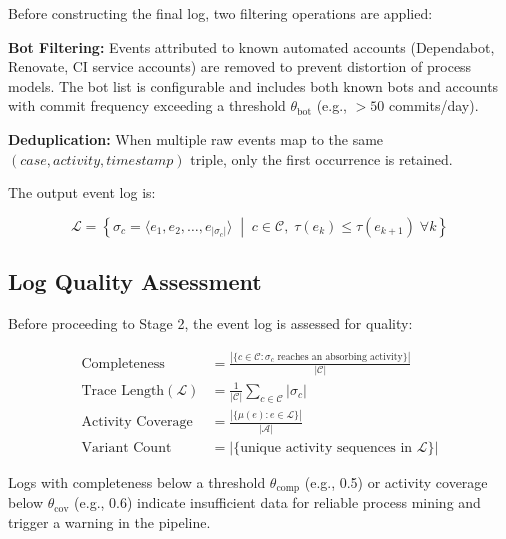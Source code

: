 Before constructing the final log, two filtering operations are applied:

\textbf{Bot Filtering:} Events attributed to known automated accounts 
(Dependabot, Renovate, CI service accounts) are removed to prevent 
distortion of process models. The bot list is configurable and includes 
both known bots and accounts with commit frequency exceeding a threshold 
$\theta_{\text{bot}}$ (e.g., $> 50$ commits/day).

\textbf{Deduplication:} When multiple raw events map to the same 
$(case, activity, timestamp)$ triple, only the first occurrence is 
retained.

The output event log is:

\begin{equation}
\label{eq:final-log}
\mathcal{L} = \left\{ \sigma_c = \langle e_1, e_2, \ldots, e_{|\sigma_c|} \rangle 
    \;\middle|\; c \in \mathcal{C}, \; 
    \tau(e_k) \leq \tau(e_{k+1}) \; \forall k \right\}
\end{equation}

\subsection{Log Quality Assessment}
\label{sec:s1-quality}

Before proceeding to Stage 2, the event log is assessed for quality:

\begin{definition}
\label{def:log-quality}
\begin{align}
\text{Completeness} &= \frac{|\{c \in \mathcal{C} : \sigma_c \text{ reaches an absorbing activity}\}|}{|\mathcal{C}|} 
    \label{eq:log-completeness} \\
\text{Trace Length}(\mathcal{L}) &= \frac{1}{|\mathcal{C}|} \sum_{c \in \mathcal{C}} |\sigma_c|
    \label{eq:trace-length} \\
\text{Activity Coverage} &= \frac{|\{\mu(e) : e \in \mathcal{L}\}|}{|\mathcal{A}|}
    \label{eq:activity-coverage} \\
\text{Variant Count} &= |\{\text{unique activity sequences in } \mathcal{L}\}|
    \label{eq:variant-count}
\end{align}
\end{definition}

Logs with completeness below a threshold $\theta_{\text{comp}}$ (e.g., 0.5) 
or activity coverage below $\theta_{\text{cov}}$ (e.g., 0.6) indicate 
insufficient data for reliable process mining and trigger a warning in the 
pipeline.


